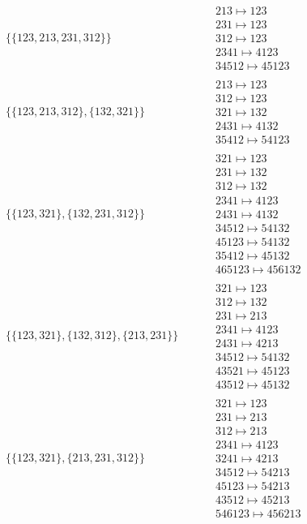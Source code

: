 \begin{tiny}
\begin{align}
\{\{123, 213, 231, 312\}\}
\quad
&
\phantom{.}
&
\begin{matrix}
213 \mapsto 123\\231 \mapsto 123\\312 \mapsto 123\\2341 \mapsto 4123\\34512 \mapsto 45123
\end{matrix}
\\
\{\{123, 213, 312\}, \{132, 321\}\}
\quad
&
\phantom{.}
&
\begin{matrix}
213 \mapsto 123\\312 \mapsto 123\\321 \mapsto 132\\2431 \mapsto 4132\\35412 \mapsto 54123
\end{matrix}
\\
\{\{123, 321\}, \{132, 231, 312\}\}
\quad
&
\phantom{.}
&
\begin{matrix}
321 \mapsto 123\\231 \mapsto 132\\312 \mapsto 132\\2341 \mapsto 4123\\2431 \mapsto 4132\\34512 \mapsto 54132\\45123 \mapsto 54132\\35412 \mapsto 45132\\465123 \mapsto 456132
\end{matrix}
\\
\{\{123, 321\}, \{132, 312\}, \{213, 231\}\}
\quad
&
\phantom{.}
&
\begin{matrix}
321 \mapsto 123\\312 \mapsto 132\\231 \mapsto 213\\2341 \mapsto 4123\\2431 \mapsto 4213\\34512 \mapsto 54132\\43521 \mapsto 45123\\43512 \mapsto 45132
\end{matrix}
\\
\{\{123, 321\}, \{213, 231, 312\}\}
\quad
&
\phantom{.}
&
\begin{matrix}
321 \mapsto 123\\231 \mapsto 213\\312 \mapsto 213\\2341 \mapsto 4123\\3241 \mapsto 4213\\34512 \mapsto 54213\\45123 \mapsto 54213\\43512 \mapsto 45213\\546123 \mapsto 456213

\end{matrix}
\end{align}
\end{tiny}
